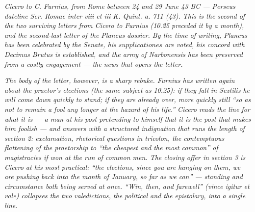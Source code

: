 
\textit{Cicero to C. Furnius, from Rome between 24 and 29
June 43 BC --- Perseus dateline \textit{Scr. Romae inter
viii et iii K. Quint. a. 711 (43)}. This is the second
of the two surviving letters from Cicero to Furnius
(10.25 preceded it by a month), and the second-last
letter of the Plancus dossier. By the time of writing,
Plancus has been celebrated by the Senate, his
$\textit{supplicationes}$ are voted, his concord with
Decimus Brutus is established, and the army of
Narbonensis has been preserved from a costly engagement
--- the news that opens the letter.}

\textit{The body of the letter, however, is a sharp
rebuke. Furnius has written again about the praetor's
elections (the same subject as 10.25): if they fall in
Sextilis he will come down quickly to stand; if they
are already over, more quickly still ``so as not to
remain a fool any longer at the hazard of his life.''
Cicero reads the line for what it is --- a man at his
post pretending to himself that it is the post that
makes him foolish --- and answers with a structured
indignation that runs the length of section 2:
exclamation, rhetorical questions in tricolon, the
contemptuous flattening of the praetorship to ``the
cheapest and the most common'' of magistracies if won
at the run of common men. The closing offer in section
3 is Cicero at his most practical: ``the elections,
since you are hanging on them, we are pushing back into
the month of January, so far as we can'' --- standing
and circumstance both being served at once. ``Win,
then, and farewell'' (\textit{vince igitur et vale})
collapses the two valedictions, the political and the
epistolary, into a single line.}

